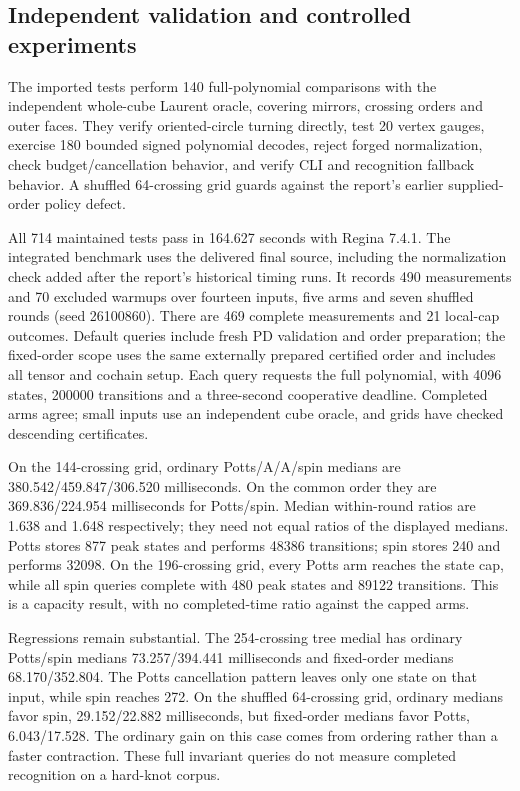 \subsection{Independent validation and controlled experiments}
The imported tests perform 140 full-polynomial comparisons with the
independent whole-cube Laurent oracle, covering mirrors, crossing orders
and outer faces. They verify oriented-circle turning directly, test
20 vertex gauges, exercise 180 bounded signed polynomial decodes, reject
forged normalization, check budget/cancellation behavior, and verify CLI
and recognition fallback behavior. A shuffled 64-crossing grid guards
against the report's earlier supplied-order policy defect.

All 714 maintained tests pass in 164.627 seconds with Regina 7.4.1.
The integrated benchmark uses the delivered final source, including the
normalization check added after the report's historical timing runs.
It records 490 measurements and 70 excluded warmups over fourteen inputs,
five arms and seven shuffled rounds (seed 26100860). There are 469 complete
measurements and 21 local-cap outcomes. Default queries include fresh PD
validation and order preparation; the fixed-order scope uses the same
externally prepared certified order and includes all tensor and cochain setup.
Each query requests the full polynomial, with 4096 states, 200000 transitions
and a three-second cooperative deadline. Completed arms agree; small inputs
use an independent cube oracle, and grids have checked descending certificates.



On the 144-crossing grid, ordinary Potts/A/A/spin medians are
380.542/459.847/306.520 milliseconds. On the common order they are
369.836/224.954 milliseconds for Potts/spin. Median within-round ratios are
1.638 and 1.648 respectively; they need not equal ratios of the displayed
medians. Potts stores 877 peak states and performs 48386 transitions;
spin stores 240 and performs 32098. On the 196-crossing grid, every Potts
arm reaches the state cap, while all spin queries complete with 480 peak
states and 89122 transitions. This is a capacity result, with no
completed-time ratio against the capped arms.

Regressions remain substantial. The 254-crossing tree medial has ordinary
Potts/spin medians 73.257/394.441 milliseconds and fixed-order medians
68.170/352.804. The Potts cancellation pattern leaves only one state on
that input, while spin reaches 272. On the shuffled 64-crossing grid,
ordinary medians favor spin, 29.152/22.882 milliseconds, but fixed-order
medians favor Potts, 6.043/17.528. The ordinary gain on this case comes
from ordering rather than a faster contraction. These full invariant
queries do not measure completed recognition on a hard-knot corpus.

